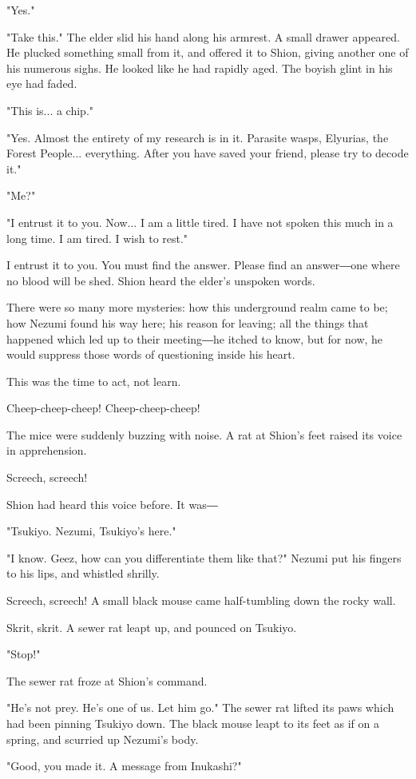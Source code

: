 "Yes."

"Take this." The elder slid his hand along his armrest. A small drawer
appeared. He plucked something small from it, and offered it to Shion,
giving another one of his numerous sighs. He looked like he had rapidly
aged. The boyish glint in his eye had faded.

"This is... a chip."

"Yes. Almost the entirety of my research is in it. Parasite wasps,
Elyurias, the Forest People... everything. After you have saved your
friend, please try to decode it."

"Me?"

"I entrust it to you. Now... I am a little tired. I have not spoken this
much in a long time. I am tired. I wish to rest."

I entrust it to you. You must find the answer. Please find an answer―one
where no blood will be shed. Shion heard the elder's unspoken words.

There were so many more mysteries: how this underground realm came to
be; how Nezumi found his way here; his reason for leaving; all the
things that happened which led up to their meeting―he itched to know,
but for now, he would suppress those words of questioning inside his
heart.

This was the time to act, not learn.

Cheep-cheep-cheep! Cheep-cheep-cheep!

The mice were suddenly buzzing with noise. A rat at Shion's feet raised
its voice in apprehension.

Screech, screech!

Shion had heard this voice before. It was―

"Tsukiyo. Nezumi, Tsukiyo's here."

"I know. Geez, how can you differentiate them like that?" Nezumi put his
fingers to his lips, and whistled shrilly.

Screech, screech! A small black mouse came half-tumbling down the rocky
wall.

Skrit, skrit. A sewer rat leapt up, and pounced on Tsukiyo.

"Stop!"

The sewer rat froze at Shion's command.

"He's not prey. He's one of us. Let him go." The sewer rat lifted its
paws which had been pinning Tsukiyo down. The black mouse leapt to its
feet as if on a spring, and scurried up Nezumi's body.

"Good, you made it. A message from Inukashi?"

